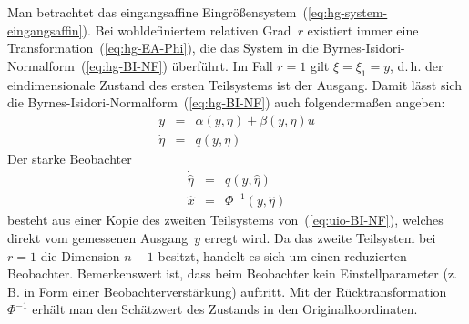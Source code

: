 Man betrachtet das eingangsaffine Eingrößensystem~(\ref{eq:hg-system-eingangsaffin}).
Bei wohldefiniertem relativen Grad~$r$ existiert immer eine Transformation~(\ref{eq:hg-EA-Phi}),
die das System in die Byrnes-Isidori-Normalform~(\ref{eq:hg-BI-NF})
überführt. Im Fall $r=1$ gilt $\xi=\xi_{1}=y$, d.\,h. der eindimensionale
Zustand des ersten Teilsystems ist der Ausgang. Damit lässt sich die
Byrnes-Isidori-Normalform~(\ref{eq:hg-BI-NF}) auch folgendermaßen
angeben: 
\begin{equation}
\begin{array}{rcl}
\dot{y} & = & \alpha(y,\eta)+\beta(y,\eta)u\\
\dot{\eta} & = & q(y,\eta)
\end{array}\label{eq:uio-BI-NF}
\end{equation}
Der starke Beobachter 
\begin{equation}
\begin{array}{ccl}
\dot{\hat{\eta}} & = & q(y,\hat{\eta})\\
\hat{x} & = & \Phi^{-1}(y,\hat{\eta})
\end{array}\label{eq:uio-beobachter}
\end{equation}
besteht aus einer Kopie des zweiten Teilsystems von~(\ref{eq:uio-BI-NF}),
welches direkt vom gemessenen Ausgang~$y$ erregt wird. Da das zweite
Teilsystem bei $r=1$ die Dimension $n-1$ besitzt, handelt es sich
um einen reduzierten Beobachter. Bemerkenswert
ist, dass beim Beobachter kein Einstellparameter (z.\,B. in Form
einer Beobachterverstärkung) auftritt. Mit der Rücktransformation~$\Phi^{-1}$
erhält man den Schätzwert des Zustands in den Originalkoordinaten.

